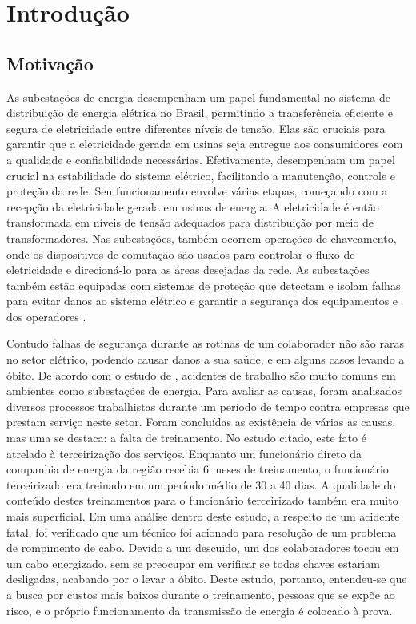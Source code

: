 \chapter{Introdução}

\section{Motivação}
\label{sec:motivation}

As subestações de energia desempenham um papel fundamental no sistema de distribuição de energia elétrica no Brasil, permitindo a transferência eficiente e segura de eletricidade entre diferentes níveis de tensão. Elas são cruciais para garantir que a eletricidade gerada em usinas seja entregue aos consumidores com a qualidade e confiabilidade necessárias. Efetivamente, desempenham um papel crucial na estabilidade do sistema elétrico, facilitando a manutenção, controle e proteção da rede. Seu funcionamento envolve várias etapas, começando com a recepção da eletricidade gerada em usinas de energia. A eletricidade é então transformada em níveis de tensão adequados para distribuição por meio de transformadores. Nas subestações, também ocorrem operações de chaveamento, onde os dispositivos de comutação são usados para controlar o fluxo de eletricidade e direcioná-lo para as áreas desejadas da rede. As subestações também estão equipadas com sistemas de proteção que detectam e isolam falhas para evitar danos ao sistema elétrico e garantir a segurança dos equipamentos e dos operadores \cite{randolph2013electric}.

Contudo falhas de segurança durante as rotinas de um colaborador não são raras no setor elétrico, podendo causar danos a sua saúde, e em alguns casos levando a óbito. De acordo com o estudo de \cite {lima2021precarizaccao}, acidentes de trabalho são muito comuns em ambientes como subestações de energia. Para avaliar as causas, foram analisados diversos processos trabalhistas durante um período de tempo contra empresas que prestam serviço neste setor. Foram concluídas as existência de várias as causas, mas uma se destaca: a falta de treinamento. No estudo citado, este fato é atrelado à terceirização dos serviços. Enquanto um funcionário direto da companhia de energia da região recebia 6 meses de treinamento, o funcionário terceirizado era treinado em um período médio de 30 a 40 dias. A qualidade do conteúdo destes treinamentos para o funcionário terceirizado também era muito mais superficial. Em uma análise dentro deste estudo, a respeito de um acidente fatal, foi verificado que um técnico foi acionado para resolução de um problema de rompimento de cabo. Devido a um descuido, um dos colaboradores tocou em um cabo energizado, sem se preocupar em verificar se todas chaves estariam desligadas, acabando por o levar a óbito. Deste estudo, portanto, entendeu-se que a busca por custos mais baixos durante o treinamento, pessoas que se expõe ao risco, e o próprio funcionamento da transmissão de energia é colocado à prova. 

